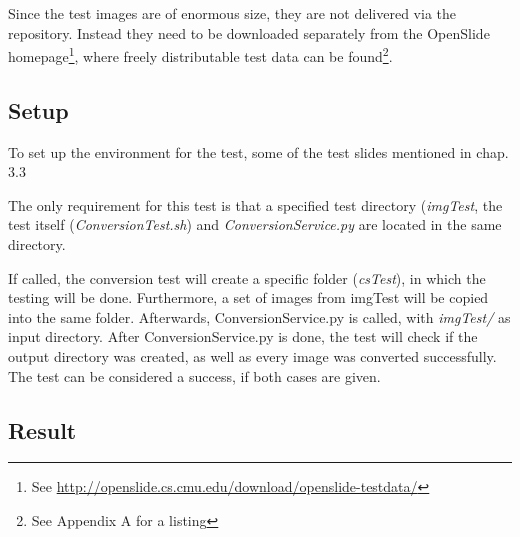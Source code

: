 Since the test images are of enormous size, they are not delivered via the repository. Instead they need to be downloaded separately from the OpenSlide homepage\footnote{See \url{http://openslide.cs.cmu.edu/download/openslide-testdata/}}, where freely distributable test data can be found\footnote{See Appendix A for a listing}.

\subsection{Setup}

To set up the environment for the test, some of the test slides mentioned in chap. 3.3 

The only requirement for this test is that a specified test directory (\emph{imgTest}, the test itself (\emph{ConversionTest.sh}) and \emph{ConversionService.py} are located in the same directory. 

If called, the conversion test will create a specific folder (\emph{csTest}), in which the testing will be done. Furthermore, a set of images from imgTest will be copied into the same folder. Afterwards, ConversionService.py is called, with \emph{imgTest/} as input directory. After ConversionService.py is done, the test will check if the output directory was created, as well as every image was converted successfully. The test can be considered a success, if both cases are given.


\subsection{Result}
